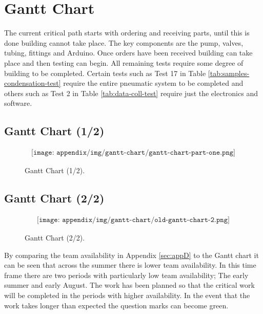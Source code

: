 \section{Gantt Chart} \label{sec:appF}
The current critical path starts with ordering and receiving parts, until this is done building cannot take place. The key components are the pump, valves, tubing, fittings and Arduino. Once orders have been received building can take place and then testing can begin. All remaining tests require some degree of building to be completed. Certain tests such as Test 17 in Table \ref{tab:samples-condensation-test} require the entire pneumatic system to be completed and others such as Test 2 in Table \ref{tab:data-coll-test} require just the electronics and software.
\subsection{Gantt Chart (1/2)}
\begin{figure}[H]
    \begin{align*}
        \texttt{[image: appendix/img/gantt-chart/gantt-chart-part-one.png]}
    \end{align*}
    \caption{Gantt Chart (1/2).}
    \label{fig:gantt-chart-1}
\end{figure}

\subsection{Gantt Chart (2/2)}

\begin{figure}[H]
    \begin{align*}
        \texttt{[image: appendix/img/gantt-chart/old-gantt-chart-2.png]}
    \end{align*}
    \caption{Gantt Chart (2/2).}
    \label{fig:gantt-chart-2}
\end{figure}

By comparing the team availability in Appendix \ref{sec:appD} to the Gantt chart it can be seen that across the summer there is lower team availability. In this time frame there are two periods with particularly low team availability; The early summer and early August. The work has been planned so that the critical work will be completed in the periods with higher availability. In the event that the work takes longer than expected the question marks can become green.